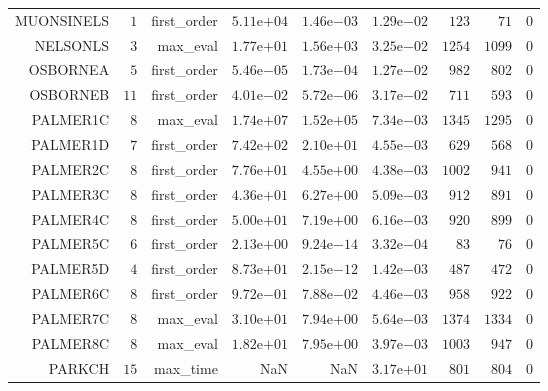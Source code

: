 \begin{longtable}{rrrrrrrrr}
MUONSINELS & \(     1\) & first\_order & \( 5.11\)e\(+04\) & \( 1.46\)e\(-03\) & \( 1.29\)e\(-02\) & \(   123\) & \(    71\) & \(     0\) \\
NELSONLS & \(     3\) & max\_eval & \( 1.77\)e\(+01\) & \( 1.56\)e\(+03\) & \( 3.25\)e\(-02\) & \(  1254\) & \(  1099\) & \(     0\) \\
OSBORNEA & \(     5\) & first\_order & \( 5.46\)e\(-05\) & \( 1.73\)e\(-04\) & \( 1.27\)e\(-02\) & \(   982\) & \(   802\) & \(     0\) \\
OSBORNEB & \(    11\) & first\_order & \( 4.01\)e\(-02\) & \( 5.72\)e\(-06\) & \( 3.17\)e\(-02\) & \(   711\) & \(   593\) & \(     0\) \\
PALMER1C & \(     8\) & max\_eval & \( 1.74\)e\(+07\) & \( 1.52\)e\(+05\) & \( 7.34\)e\(-03\) & \(  1345\) & \(  1295\) & \(     0\) \\
PALMER1D & \(     7\) & first\_order & \( 7.42\)e\(+02\) & \( 2.10\)e\(+01\) & \( 4.55\)e\(-03\) & \(   629\) & \(   568\) & \(     0\) \\
PALMER2C & \(     8\) & first\_order & \( 7.76\)e\(+01\) & \( 4.55\)e\(+00\) & \( 4.38\)e\(-03\) & \(  1002\) & \(   941\) & \(     0\) \\
PALMER3C & \(     8\) & first\_order & \( 4.36\)e\(+01\) & \( 6.27\)e\(+00\) & \( 5.09\)e\(-03\) & \(   912\) & \(   891\) & \(     0\) \\
PALMER4C & \(     8\) & first\_order & \( 5.00\)e\(+01\) & \( 7.19\)e\(+00\) & \( 6.16\)e\(-03\) & \(   920\) & \(   899\) & \(     0\) \\
PALMER5C & \(     6\) & first\_order & \( 2.13\)e\(+00\) & \( 9.24\)e\(-14\) & \( 3.32\)e\(-04\) & \(    83\) & \(    76\) & \(     0\) \\
PALMER5D & \(     4\) & first\_order & \( 8.73\)e\(+01\) & \( 2.15\)e\(-12\) & \( 1.42\)e\(-03\) & \(   487\) & \(   472\) & \(     0\) \\
PALMER6C & \(     8\) & first\_order & \( 9.72\)e\(-01\) & \( 7.88\)e\(-02\) & \( 4.46\)e\(-03\) & \(   958\) & \(   922\) & \(     0\) \\
PALMER7C & \(     8\) & max\_eval & \( 3.10\)e\(+01\) & \( 7.94\)e\(+00\) & \( 5.64\)e\(-03\) & \(  1374\) & \(  1334\) & \(     0\) \\
PALMER8C & \(     8\) & max\_eval & \( 1.82\)e\(+01\) & \( 7.95\)e\(+00\) & \( 3.97\)e\(-03\) & \(  1003\) & \(   947\) & \(     0\) \\
PARKCH & \(    15\) & max\_time &       NaN &       NaN & \( 3.17\)e\(+01\) & \(   801\) & \(   804\) & \(     0\) \\

\end{longtable}
